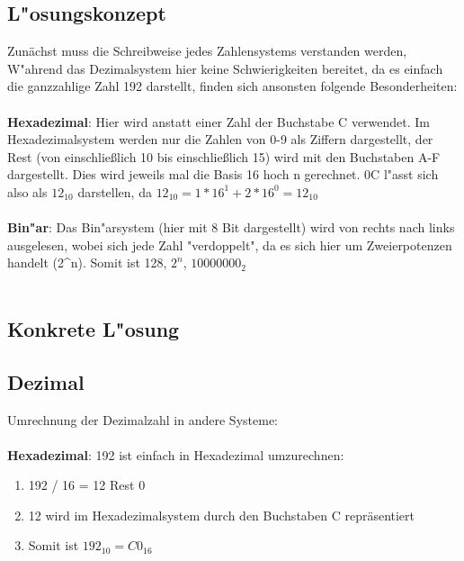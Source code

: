 \documentclass[a4paper,11pt,titlepage]{article}
\begin{document}
    \subsection{L"osungskonzept}
    Zunächst muss die Schreibweise jedes Zahlensystems verstanden werden, W"ahrend das Dezimalsystem hier keine Schwierigkeiten bereitet, da es einfach die ganzzahlige Zahl 192 darstellt, finden sich ansonsten folgende Besonderheiten: \\ \\
    \textbf{Hexadezimal}: Hier wird anstatt einer Zahl der Buchstabe C verwendet. Im Hexadezimalsystem werden nur die Zahlen von 0-9 als Ziffern dargestellt, der Rest (von einschließlich 10 bis einschließlich 15) wird mit den Buchstaben A-F dargestellt. Dies wird jeweils mal die Basis 16 hoch n gerechnet. 0C l"asst sich also als $12_{10}$ darstellen, da $12_{10} = 1*16^1 + 2*16^0 = 12_{10}$ \\ \\
    \textbf{Bin"ar}: Das Bin"arsystem (hier mit 8 Bit dargestellt) wird von rechts nach links ausgelesen, wobei sich jede Zahl "verdoppelt", da es sich hier um Zweierpotenzen handelt (2^n). Somit ist 128, $2^n$, $10000000_2$ \\ \\

    \subsection{Konkrete L"osung}

    \subsection*{Dezimal}
    Umrechnung der Dezimalzahl in andere Systeme: \\ \\
    \noindent \textbf{Hexadezimal}: 192 ist einfach in Hexadezimal umzurechnen:
    \begin{enumerate}
        \item 192 / 16 = 12 Rest 0
        \item 12 wird im Hexadezimalsystem durch den Buchstaben C repräsentiert
        \item Somit ist $192_10 = C0_{16}$
    \end{enumerate}
\end{document}
